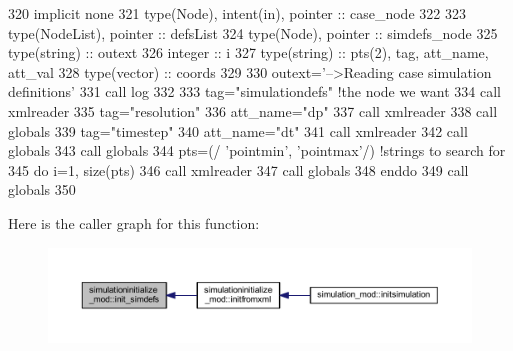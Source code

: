 \begin{DoxyCode}
320     \textcolor{keywordtype}{implicit none}
321     \textcolor{keywordtype}{type}(Node), \textcolor{keywordtype}{intent(in)}, \textcolor{keywordtype}{pointer} :: case\_node
322 
323     \textcolor{keywordtype}{type}(NodeList), \textcolor{keywordtype}{pointer} :: defsList
324     \textcolor{keywordtype}{type}(Node), \textcolor{keywordtype}{pointer} :: simdefs\_node
325     \textcolor{keywordtype}{type}(string) :: outext
326     \textcolor{keywordtype}{integer} :: i
327     \textcolor{keywordtype}{type}(string) :: pts(2), tag, att\_name, att\_val
328     \textcolor{keywordtype}{type}(vector) :: coords
329 
330     outext=\textcolor{stringliteral}{'-->Reading case simulation definitions'}
331     \textcolor{keyword}{call }log%
332 
333     tag=\textcolor{stringliteral}{"simulationdefs"}    \textcolor{comment}{!the node we want}
334     \textcolor{keyword}{call }xmlreader%
335     tag=\textcolor{stringliteral}{"resolution"}
336     att\_name=\textcolor{stringliteral}{"dp"}
337     \textcolor{keyword}{call }xmlreader%
338     \textcolor{keyword}{call }globals%
339     tag=\textcolor{stringliteral}{"timestep"}
340     att\_name=\textcolor{stringliteral}{"dt"}
341     \textcolor{keyword}{call }xmlreader%
342     \textcolor{keyword}{call }globals%
343     \textcolor{keyword}{call }globals%
344     pts=(/ \textcolor{stringliteral}{'pointmin'}, \textcolor{stringliteral}{'pointmax'}/) \textcolor{comment}{!strings to search for}
345     \textcolor{keywordflow}{do} i=1, \textcolor{keyword}{size}(pts)
346         \textcolor{keyword}{call }xmlreader%
347         \textcolor{keyword}{call }globals%
348 \textcolor{keywordflow}{    enddo}
349     \textcolor{keyword}{call }globals%
350 
\end{DoxyCode}
Here is the caller graph for this function\+:\nopagebreak
\begin{figure}[H]
\begin{center}
\leavevmode
\includegraphics[width=350pt]{namespacesimulationinitialize__mod_af6b2508d52e9e29aeb6e7dfbabd88e8d_icgraph}
\end{center}
\end{figure}
\mbox{\label{namespacesimulationinitialize__mod_acaa6b217159e3a10e7db04dd7b0e4058}} 
